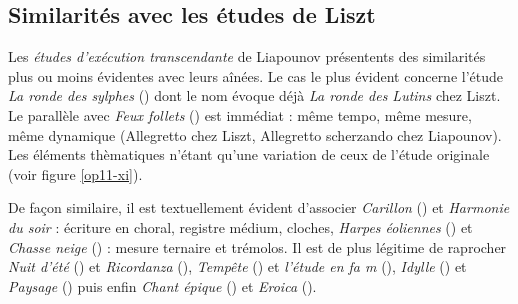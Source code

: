 \subsection{Similarités avec les études de Liszt}

Les \emph{études d'exécution transcendante} de Liapounov présentents des similarités plus ou moins évidentes avec leurs aînées. Le cas le plus évident concerne l'étude \emph{La ronde des sylphes} () dont le nom évoque déjà \emph{La ronde des Lutins} chez Liszt. Le parallèle avec \emph{Feux follets} () est immédiat : même tempo, même mesure, même dynamique (Allegretto chez Liszt, Allegretto scherzando chez Liapounov). Les éléments thèmatiques n'étant qu'une variation de ceux de l'étude originale (voir figure \ref{op11-xi}).

De façon similaire, il est textuellement évident d'associer \emph{Carillon} () et \emph{Harmonie du soir} : écriture en choral, registre médium, cloches, \emph{Harpes éoliennes} () et \emph{Chasse neige} () : mesure ternaire et trémolos. Il est de plus légitime de raprocher \emph{Nuit d'été} () et \emph{Ricordanza} (), \emph{Tempête} () et \emph{l'étude en fa m} (), \emph{Idylle} () et \emph{Paysage} () puis enfin \emph{Chant épique} () et \emph{Eroica} ().

